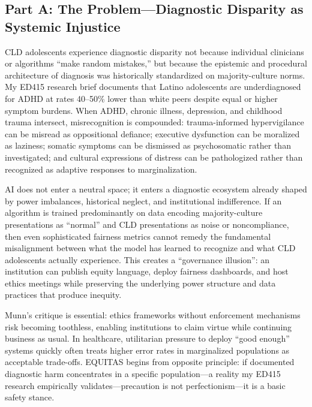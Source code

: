 \documentclass[12pt,a4paper]{article}
\begin{document}
\subsection{Part A: The Problem—Diagnostic Disparity as Systemic Injustice}

CLD adolescents experience diagnostic disparity not because individual clinicians or algorithms ``make random mistakes,'' but because the epistemic and procedural architecture of diagnosis was historically standardized on majority-culture norms.\cite{garcia_ed415} My ED415 research brief documents that Latino adolescents are underdiagnosed for ADHD at rates 40--50\% lower than white peers despite equal or higher symptom burdens.\cite{garcia_ed415} When ADHD, chronic illness, depression, and childhood trauma intersect, misrecognition is compounded: trauma-informed hypervigilance can be misread as oppositional defiance; executive dysfunction can be moralized as laziness; somatic symptoms can be dismissed as psychosomatic rather than investigated; and cultural expressions of distress can be pathologized rather than recognized as adaptive responses to marginalization.\cite{garcia_ed415}

AI does not enter a neutral space; it enters a diagnostic ecosystem already shaped by power imbalances, historical neglect, and institutional indifference. If an algorithm is trained predominantly on data encoding majority-culture presentations as ``normal'' and CLD presentations as noise or noncompliance, then even sophisticated fairness metrics cannot remedy the fundamental misalignment between what the model has learned to recognize and what CLD adolescents actually experience.\cite{marko2025} This creates a ``governance illusion'': an institution can publish equity language, deploy fairness dashboards, and host ethics meetings while preserving the underlying power structure and data practices that produce inequity.\cite{munn_idai700}

Munn's critique is essential: ethics frameworks without enforcement mechanisms risk becoming toothless, enabling institutions to claim virtue while continuing business as usual.\cite{munn_idai700} In healthcare, utilitarian pressure to deploy ``good enough'' systems quickly often treats higher error rates in marginalized populations as acceptable trade-offs. EQUITAS begins from opposite principle: if documented diagnostic harm concentrates in a specific population—a reality my ED415 research empirically validates—precaution is not perfectionism—it is a basic safety stance.\cite{garcia_ed415}
\end{document}
